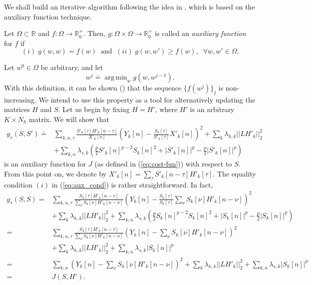 \documentclass[12pt]{article}
\DeclareMathOperator*{\argmin}{arg\,min}
\begin{document}
We shall build an iterative algorithm following the idea in \cite{kameoka2009}, which is based on the auxiliary function technique.

Let $\Omega\subset\mathbb{R}$ and $f:\Omega\rightarrow\mathbb{R}_0^+$. Then, $g:\Omega\times\Omega\rightarrow\mathbb{R}_0^+$ is called an \emph{auxiliary function} for $f$ if
%
\begin{equation} \label{eq:aux_cond}
(i)\; g(w,w) = f(w)  \;\;\text{and}\;\;  (ii)\; g(w,w')\geq f(w), \;\; \forall w,w'\in\Omega.
\end{equation}

Let $w^0\in\Omega$ be arbitrary, and let
%
\begin{equation} \label{eq:gen-up-rule}
w^j \doteq \argmin_wg(w,w^{j-1}).
\end{equation}
%
With this definition, it can be shown (\cite{lee2001}) that the sequence $\{f(w^j)\}_j$ is non-increasing. We intend to use this property as a tool for alternatively updating the matrices $H$ and $S$. Let us begin by fixing $H=H'$, where $H'$ is an arbitrary $K\times N_h$ matrix. We will show that
%
\begin{align}\label{eq:aux_s}
g_s(S,S') \doteq &\sum_{k,n,\tau} \frac{S'_k[\tau]H'_k[n-\tau]}{X'_k[n]}\left( Y_k[n]-\frac{S_k[\tau]}{S'_k[\tau]}X'_k[n] \right)^2 +\sum_k\lambda_{h,k}||LH'_k||_2^2\nonumber \\ &+\sum_{k,n}\lambda_{s,k}\left(\frac{p}{2}S'_k[n]^{p-2}S_k[n]^2+|S'_k[n]|^{p} -\frac{p}{2}|S'_k[n]|^{p}\right)
\end{align}
%
is an auxiliary function for $J$ (as defined  in (\ref{eq:cost-fun})) with respect to $S$. From this point on, we denote by $X'_k[n] =  \sum_{\tau} S'_k[n-\tau] H'_k[\tau]$. The equality condition $(i)$ in (\ref{eq:aux_cond}) is rather straightforward. In fact,
%
\small
\begin{align}
g_s(S,S)
= &\sum_{k,n,\tau} \frac{S_k[\tau]H'_k[n-\tau]}{\sum_{\nu} S_k[\nu]H'_k[n-\nu]}\left( Y_k[n]-\frac{S_k[\tau]}{S_k[\tau]}\sum_{\nu} S_k[\nu]H'_k[n-\nu] \right)^2\nonumber \\
&+\sum_k\lambda_{h,k}||LH'_k||_2^2 +\sum_{k,n}\lambda_{s,k}\left(\frac{p}{2}S_k[n]^{p-2}S_k[n]^2+|S_k[n]|^{p} -\frac{p}{2}|S_k[n]|^{p}\right) \nonumber\\
=&\sum_{k,n,\tau} \frac{S_k[\tau]H'_k[n-\tau]}{\sum_{\nu} S_k[\nu]H'_k[n-\nu]}\left( Y_k[n]-\sum_{\nu} S_k[\nu]H'_k[n-\nu] \right)^2 \nonumber \\ &+\sum_k\lambda_{h,k}||LH'_k||_2^2  +\sum_{k,n}\lambda_{s,k}|S_k[n]|^{p} \nonumber \\
=&\sum_{k,n} \left( Y_k[n]-\sum_{\nu} S_k[\nu]H'_k[n-\nu] \right)^2 +\sum_k\lambda_{h,k}||LH'_k||_2^2+\sum_{k,n}\lambda_{s,k}|S_k[n]|^{p} \nonumber \\ =& J(S,H').\nonumber
\end{align}
\normalsize
\end{document}

